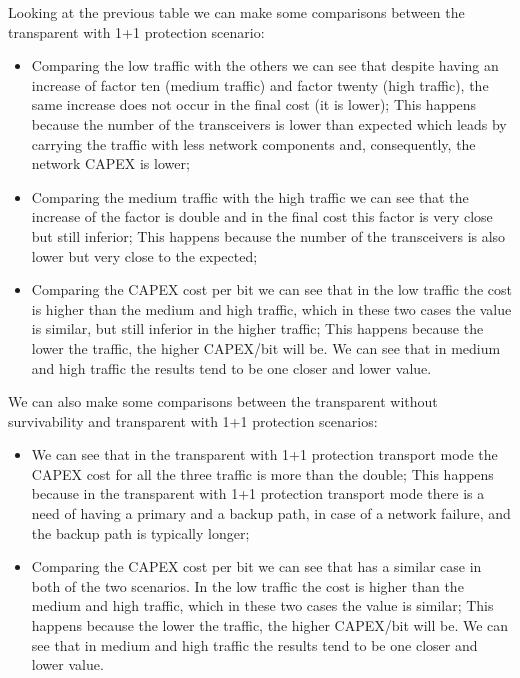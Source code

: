 \noindent
Looking at the previous table we can make some comparisons between the transparent with 1+1 protection scenario:

\begin{itemize}
  \item Comparing the low traffic with the others we can see that despite having an increase of factor ten (medium traffic) and factor twenty (high traffic), the same increase does not occur in the final cost (it is lower);
  \subitem This happens because the number of the transceivers is lower than expected which leads by carrying the traffic with less network components and, consequently, the network CAPEX is lower;
  \item Comparing the medium traffic with the high traffic we can see that the increase of the factor is double and in the final cost this factor is very close but still inferior;
  \subitem This happens because the number of the transceivers is also lower but very close to the expected;
  \item Comparing the CAPEX cost per bit we can see that in the low traffic the cost is higher than the medium and high traffic, which in these two cases the value is similar, but still inferior in the higher traffic;
  \subitem This happens because the lower the traffic, the higher CAPEX/bit will be. We can see that in medium and high traffic the results tend to be one closer and lower value.
\end{itemize}

\noindent
We can also make some comparisons between the transparent without survivability and transparent with 1+1 protection scenarios:

\begin{itemize}
  \item We can see that in the transparent with 1+1 protection transport mode the CAPEX cost for all the three traffic is more than the double;
    \subitem This happens because in the transparent with 1+1 protection transport mode there is a need of having a primary and a backup path, in case of a network failure, and the backup path is typically longer;
  \item Comparing the CAPEX cost per bit we can see that has a similar case in both of the two scenarios. In the low traffic the cost is higher than the medium and high traffic, which in these two cases the value is similar;
  \subitem This happens because the lower the traffic, the higher CAPEX/bit will be. We can see that in medium and high traffic the results tend to be one closer and lower value.
\end{itemize}

